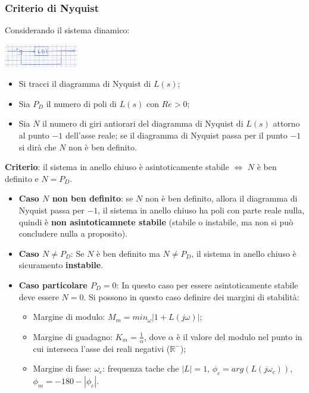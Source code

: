 \begin{landscape}
\begin{multicols*}{3}
    \subsubsection*{Criterio di Nyquist}
    Considerando il sistema dinamico:
    \begin{center}
        \includegraphics[height=1cm]{../formulario/img1.JPG}
    \end{center}
    \begin{itemize}
        \item Si tracci il diagramma di Nyquist di $L(s)$;
        \item Sia $P_D$ il numero di poli di $L(s)$ con $Re > 0$;
        \item Sia $N$ il numero di giri antiorari del diagramma di Nyquist di $L(s)$ attorno al punto $-1$ dell'asse reale; se il diagramma di Nyquist passa per il punto $-1$ si dirà che $N$ non è ben definito.
    \end{itemize}
    \textbf{Criterio}: il sistema in anello chiuso è asintoticamente stabile $\Leftrightarrow$ $N$ è ben definito e $N = P_D$.\newline
    \begin{itemize}
        \item \textbf{Caso $N$ non ben definito}:\newline
        se $N$ non è ben definito, allora il diagramma di Nyquist passa per $-1$, il sistema in anello chiuso ha poli con parte reale nulla, quindi è \textbf{non asintoticamnete stabile} (stabile o instabile, ma non si può concludere nulla a proposito).\newline
        \item \textbf{Caso $N \neq P_D$}:\newline
        Se $N$ è ben definito ma $N\neq P_D$, il sistema in anello chiuso è sicuramento \textbf{instabile}.\newline
        \item \textbf{Caso particolare $P_D = 0$}:\newline
        In questo caso per essere asintoticamente stabile deve essere $N = 0$. Si possono in questo caso definire dei margini di stabilità:
        \begin{itemize}
            \item Margine di modulo: $M_m = min_{\omega} | 1 + L(j \omega)|$;
            \item Margine di guadagno: $K_m = \frac{1}{\alpha}$, dove $\alpha$ è il valore del modulo nel punto in cui interseca l'asse dei reali negativi ($\mathbb{R}^{-}$);
            \item Margine di fase: $\omega_c$: frequenza tache che $|L| = 1$, $\phi_c = arg(L(j \omega_c))$, $\phi_m = -180 - |\phi_c|$.
        \end{itemize}
    \end{itemize}

\end{multicols*}
\end{landscape}
